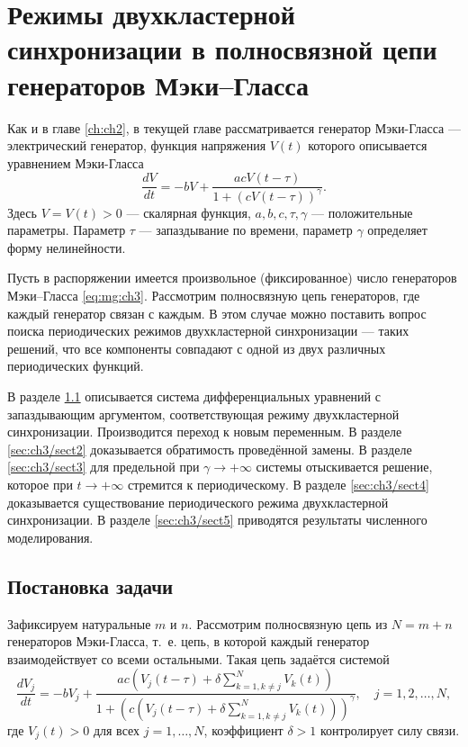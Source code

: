 \chapter{Режимы двухкластерной синхронизации в полносвязной цепи генераторов Мэки--Гласса}\label{ch:ch3}

Как и в главе \eqref{ch:ch2}, в текущей главе рассматривается генератор Мэки-Гласса --- электрический генератор, функция напряжения $V(t)$ которого описывается уравнением Мэки-Гласса
%
\begin{equation}
	\label{eq:mg:ch3}
	\dfrac{d V}{dt}=
	- bV+\dfrac{acV(t - \tau) }{1 + (cV(t - \tau))^{\gamma}}.
\end{equation}
%
Здесь $V=V(t) > 0$ --- скалярная функция, $a, b, c, \tau, \gamma$ --- положительные параметры. Параметр $\tau$ --- запаздывание по времени, параметр $\gamma$ определяет форму нелинейности.

Пусть в распоряжении имеется произвольное (фиксированное) число генераторов Мэки--Гласса \eqref{eq:mg:ch3}. Рассмотрим полносвязную цепь генераторов, где каждый генератор связан с каждым. В этом случае можно поставить вопрос поиска периодических режимов двухкластерной синхронизации --- таких решений, что все компоненты совпадают с одной из двух различных периодических функций.

В разделе \ref{sec:ch3/sect1} описывается система дифференциальных уравнений с запаздывающим аргументом, соответствующая режиму двухкластерной синхронизации. Производится переход к новым переменным. В разделе \ref{sec:ch3/sect2} доказывается обратимость проведённой замены. В разделе \ref{sec:ch3/sect3} для предельной при $\gamma \to +\infty$ системы отыскивается решение, которое при $t \to +\infty$ стремится к периодическому. В разделе \ref{sec:ch3/sect4} доказывается существование периодического режима двухкластерной синхронизации. В разделе \ref{sec:ch3/sect5} приводятся результаты численного моделирования.

\section{Постановка задачи}\label{sec:ch3/sect1}
Зафиксируем натуральные $m$ и $n$. Рассмотрим полносвязную цепь из $N = m + n$ генераторов Мэки-Гласса, т.~е. цепь, в которой каждый генератор взаимодействует со всеми остальными. Такая цепь задаётся системой
%
\begin{equation}
	\label{eq:mg_system}
	\dfrac{d V_{j}}{dt}= -bV_{j} + \dfrac{ac\left(V_{j}(t - \tau) + \delta\sum_{k=1,k\neq j}^{N}V_{k}(t)\right)}{1 + \left(c\left(V_{j}(t - \tau) + \delta\sum_{k=1,k\neq j}^{N}V_{k}(t)\right)\right)^{\gamma}}, \quad j=1, 2, \ldots, N,
\end{equation}
где $V_j(t) > 0$ для всех $j = 1, \ldots, N$, коэффициент $\delta > 1$ контролирует силу связи. 

